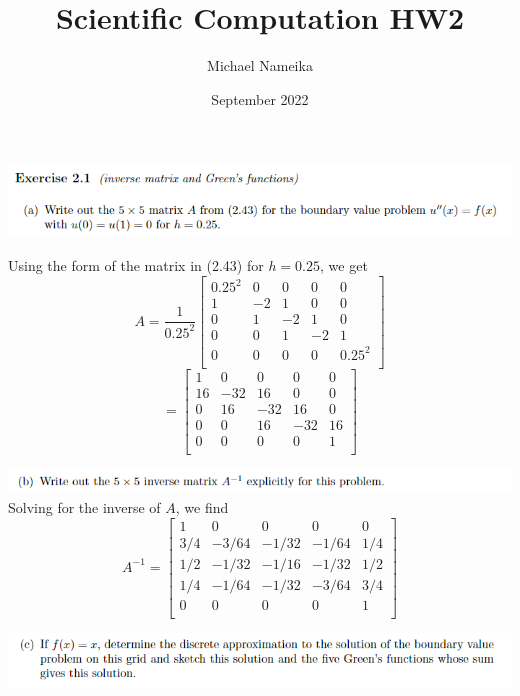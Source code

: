 \documentclass{article}
\title{Scientific Computation HW2}
\author{Michael Nameika}
\date{September 2022}
\begin{document}
 
\maketitle


\includegraphics[scale = 0.75]{prob1a.PNG}
\newline\newline

Using the form of the matrix in (2.43) for $h = 0.25$, we get
\[A = \frac{1}{0.25^2}
\begin{bmatrix}
    0.25^2 & 0 & 0 & 0 & 0\\
    1 & -2 & 1 & 0 & 0\\
    0 & 1 & -2 & 1 & 0\\
    0 & 0 & 1 & -2 & 1\\
    0 & 0 & 0 & 0 & 0.25^2\\
\end{bmatrix}\]
\[=
\begin{bmatrix}
    1 & 0 & 0 & 0 & 0\\
    16 & -32 & 16 & 0 & 0\\
    0 & 16 & -32 & 16 & 0\\
    0 & 0 & 16 & -32 & 16\\
    0 & 0 & 0 & 0 & 1\\
\end{bmatrix}\]


\includegraphics[scale = 0.75]{prob1b.PNG}
\newline\newline
Solving for the inverse of $A$, we find
\[A^{-1} = \begin{bmatrix}
    1 & 0 & 0 & 0 & 0\\
    3/4 & -3/64 & -1/32 & -1/64 & 1/4\\
    1/2 & -1/32 & -1/16 & -1/32 & 1/2\\
    1/4 & -1/64 & -1/32 & -3/64 & 3/4\\
    0 & 0 & 0 & 0 & 1\\
\end{bmatrix}\]

\includegraphics[scale = 0.75]{prob1c.PNG}
\newline\newline
\end{document}
